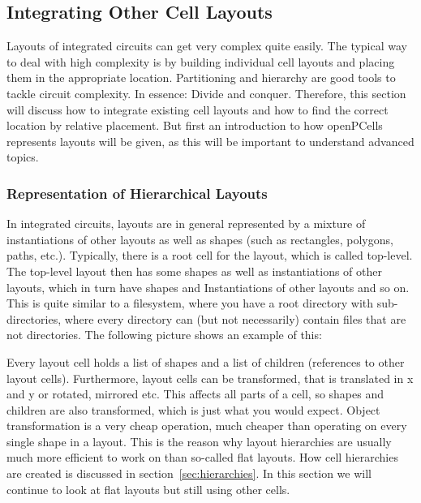 \subsection{Integrating Other Cell Layouts}
Layouts of integrated circuits can get very complex quite easily.
The typical way to deal with high complexity is by building individual cell layouts and placing them in the appropriate location.
Partitioning and hierarchy are good tools to tackle circuit complexity.
In essence: Divide and conquer.
Therefore, this section will discuss how to integrate existing cell layouts and how to find the correct location by relative placement.
But first an introduction to how openPCells represents layouts will be given, as this will be important to understand advanced topics.

\subsubsection{Representation of Hierarchical Layouts}
In integrated circuits, layouts are in general represented by a mixture of instantiations of other layouts as well as shapes (such as rectangles,
polygons, paths, etc.).
Typically, there is a root cell for the layout, which is called top-level.
The top-level layout then has some shapes as well as instantiations of other layouts, which in turn have shapes and Instantiations of other layouts and so on.
This is quite similar to a filesystem, where you have a root directory with sub-directories, where every directory can (but not necessarily) contain files that are not directories.
The following picture shows an example of this:
\begin{center}
\end{center}
Every layout cell holds a list of shapes and a list of children (references to other layout cells).
Furthermore, layout cells can be transformed, that is translated in x and y or rotated, mirrored etc.
This affects all parts of a cell, so shapes and children are also transformed, which is just what you would expect.
Object transformation is a very cheap operation, much cheaper than operating on every single shape in a layout.
This is the reason why layout hierarchies are usually much more efficient to work on than so-called flat layouts.
How cell hierarchies are created is discussed in section~\ref{sec:hierarchies}.
In this section we will continue to look at flat layouts but still using other cells.

